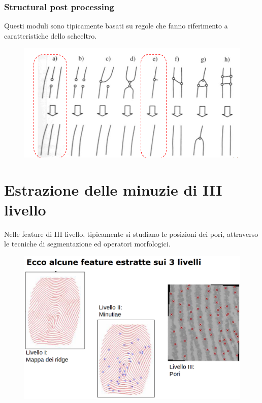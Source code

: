 \documentclass{report}
\begin{document}
\newpage
\subsubsection{Structural post processing}

Questi moduli sono tipicamente basati su regole che fanno riferimento
a caratteristiche dello scheeltro.

\begin{figure}[ht]
    \centering
    \includegraphics[width=0.75\linewidth]{images/structural-post.png}
\end{figure}

\section{Estrazione delle minuzie di III livello}

Nelle feature di III livello, tipicamente si studiano
le posizioni dei pori, attraverso le tecniche di segmentazione ed operatori morfologici.

\begin{figure}[ht]
    \centering
    \includegraphics[width=1\linewidth]{images/es-conclusivo.png}
\end{figure}
\end{document}
